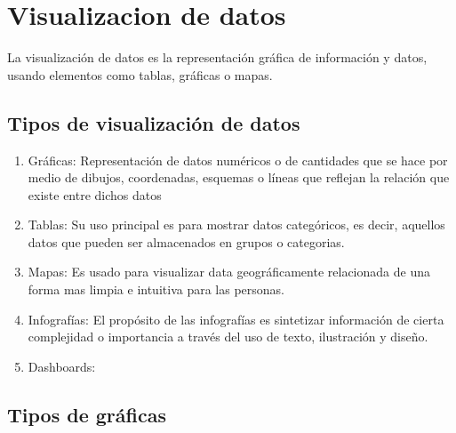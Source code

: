 \section{Visualizacion de datos}

La visualización de datos es la representación gráfica de información y datos, usando elementos como tablas, gráficas o mapas.

\subsection{Tipos de visualización de datos}

\begin{enumerate}
    \item Gráficas: Representación de datos numéricos o de cantidades que se hace por medio de dibujos, coordenadas, esquemas o líneas que reflejan la relación que existe entre dichos datos
    \item Tablas: Su uso principal es para mostrar datos categóricos, es decir, aquellos datos que pueden ser almacenados en grupos o categorias.
    \item Mapas: Es usado para visualizar data geográficamente relacionada de una forma mas limpia e intuitiva para las personas.
    \item Infografías: El propósito de las infografías es sintetizar información de cierta complejidad o importancia a través del uso de texto, ilustración y diseño.
    \item Dashboards:
\end{enumerate}

\subsection{Tipos de gráficas}